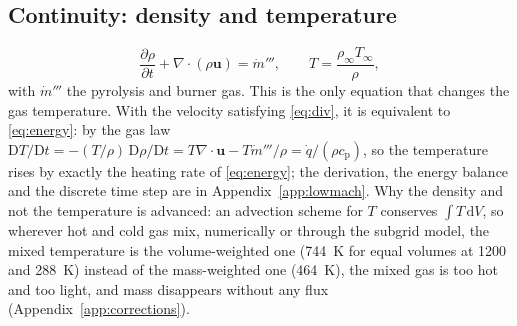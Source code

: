 \documentclass[11pt,a4paper]{article}
\newcommand{\vu}{\mathbf{u}}
\newcommand{\dd}{\,\mathrm{d}}
\begin{document}
\subsection{Continuity: density and temperature}
\begin{equation}\label{eq:continuity}
  \frac{\partial\rho}{\partial t} + \nabla\cdot(\rho\vu) = \dot m''',\qquad T=\frac{\rho_\infty T_\infty}{\rho},
\end{equation}
with $\dot m'''$ the pyrolysis and burner gas. This is the only equation that changes the gas
temperature. With the velocity satisfying \eqref{eq:div}, it is equivalent to \eqref{eq:energy}: by the
gas law $\mathrm{D}T/\mathrm{D}t=-(T/\rho)\,\mathrm{D}\rho/\mathrm{D}t=T\nabla\cdot\vu-T\dot m'''/\rho=\dot q/(\rho c_\text{p})$,
so the temperature rises by exactly the heating rate of \eqref{eq:energy}; the derivation, the energy
balance and the discrete time step are in Appendix~\ref{app:lowmach}. Why
the density and not the temperature is advanced: an advection scheme for $T$ conserves $\int T\dd V$,
so wherever hot and cold gas mix, numerically or through the subgrid model, the mixed temperature is
the volume-weighted one (744~K for equal volumes at 1200 and 288~K) instead of the mass-weighted one
(464~K), the mixed gas is too hot and too light, and mass disappears without any flux
(Appendix~\ref{app:corrections}).
\end{document}
